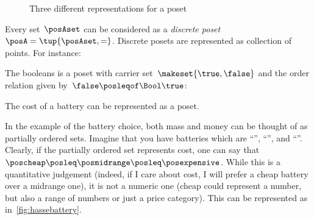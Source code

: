 \begin{figure*}[h]
    \hspace{4em}
    \hspace{4em}
    \hspace{4em}
    \caption{Three different representations for a poset}
    \label{fig:poset_representation}
\end{figure*}

\begin{example}
    \label{ex:discreteposet}
    Every set~$\posAset$ can be considered as a \emph{discrete poset}~$\posA = \tup{\posAset,=}$.
    Discrete posets are represented as collection of points.
    For instance:
\end{example}

\begin{example}[Booleans]
    \label{ex:bool}
    The booleans \index{\Bool} is a poset with carrier set~$\makeset{\true,\false}$ and the order relation given by~$\false \posleqof\Bool \true$:
\end{example}

\begin{example}

    \begin{marginfigure}
        \centering
        \caption{The cost of a battery can be represented as a poset.
        }
        \label{fig:hassebattery}
    \end{marginfigure}

    In the example of the battery choice, both mass and money can be thought of as partially ordered sets.
    Imagine that you have batteries which are ``\poscheap'', ``\posmidrange'', and ``\posexpensive''.
    Clearly, if the partially ordered set represents cost, one can say that~$\poscheap \posleq\posmidrange \posleq\posexpensive$.
    While this is a quantitative judgement (indeed, if I care about cost, I will prefer a cheap battery over a midrange one), it is not a numeric one (cheap could represent a number, but also a range of numbers or just a price category).
    This can be represented as in~\cref{fig:hassebattery}.
\end{example}

